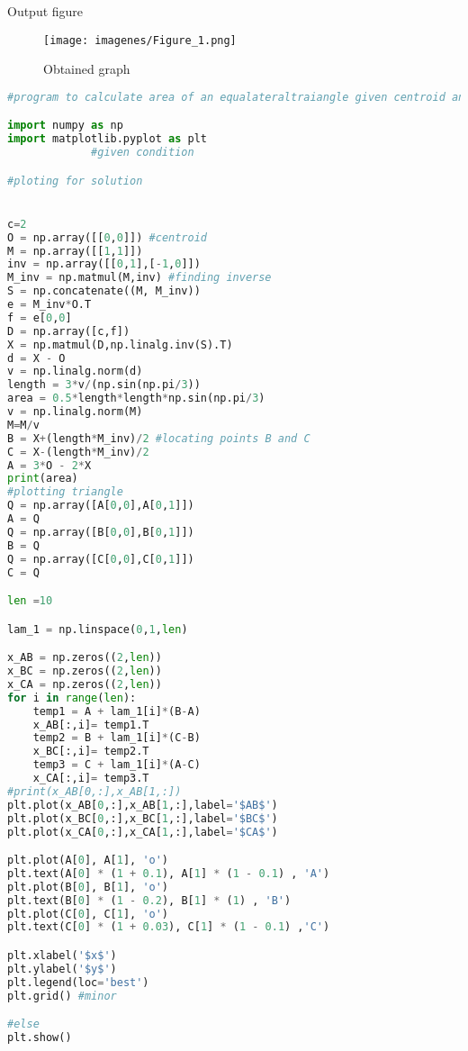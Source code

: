 \documentclass[12pt,a4paper,oneside]{report}
\begin{document}
 {\Large Output figure}
\begin{figure}[h!]
\centering
\texttt{[image: imagenes/Figure\_1.png]}
\caption{Obtained graph}
\label{fig:graph}
\end{figure}

\begin{lstlisting}[language=Python, caption=Python program  ]
#program to calculate area of an equalateraltraiangle given centroid and line equation

import numpy as np
import matplotlib.pyplot as plt
             #given condition

#ploting for solution


c=2
O = np.array([[0,0]]) #centroid
M = np.array([[1,1]])
inv = np.array([[0,1],[-1,0]])
M_inv = np.matmul(M,inv) #finding inverse
S = np.concatenate((M, M_inv))
e = M_inv*O.T
f = e[0,0]
D = np.array([c,f])
X = np.matmul(D,np.linalg.inv(S).T)
d = X - O
v = np.linalg.norm(d)
length = 3*v/(np.sin(np.pi/3))
area = 0.5*length*length*np.sin(np.pi/3)
v = np.linalg.norm(M)
M=M/v
B = X+(length*M_inv)/2 #locating points B and C
C = X-(length*M_inv)/2
A = 3*O - 2*X
print(area)
#plotting triangle
Q = np.array([A[0,0],A[0,1]])
A = Q
Q = np.array([B[0,0],B[0,1]])
B = Q
Q = np.array([C[0,0],C[0,1]])
C = Q

len =10

lam_1 = np.linspace(0,1,len)

x_AB = np.zeros((2,len))
x_BC = np.zeros((2,len))
x_CA = np.zeros((2,len))
for i in range(len):
    temp1 = A + lam_1[i]*(B-A)
    x_AB[:,i]= temp1.T
    temp2 = B + lam_1[i]*(C-B)
    x_BC[:,i]= temp2.T
    temp3 = C + lam_1[i]*(A-C)
    x_CA[:,i]= temp3.T
#print(x_AB[0,:],x_AB[1,:])
plt.plot(x_AB[0,:],x_AB[1,:],label='$AB$')
plt.plot(x_BC[0,:],x_BC[1,:],label='$BC$')
plt.plot(x_CA[0,:],x_CA[1,:],label='$CA$')

plt.plot(A[0], A[1], 'o')
plt.text(A[0] * (1 + 0.1), A[1] * (1 - 0.1) , 'A')
plt.plot(B[0], B[1], 'o')
plt.text(B[0] * (1 - 0.2), B[1] * (1) , 'B')
plt.plot(C[0], C[1], 'o')
plt.text(C[0] * (1 + 0.03), C[1] * (1 - 0.1) ,'C')

plt.xlabel('$x$')
plt.ylabel('$y$')
plt.legend(loc='best')
plt.grid() #minor

#else
plt.show()
\end{lstlisting}
\end{document}
